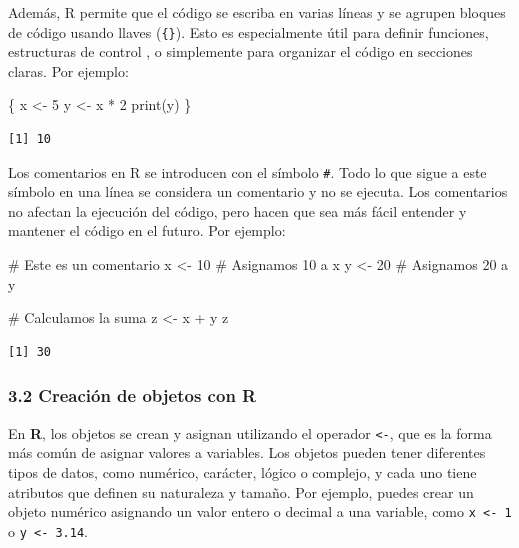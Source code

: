 \documentclass[
  letterpaper,
  DIV=11,
  numbers=noendperiod]{scrartcl}
\newenvironment{Shaded}{\begin{snugshade}}{\end{snugshade}}
\newcommand{\CommentTok}[1]{\textcolor[rgb]{0.37,0.37,0.37}{#1}}
\newcommand{\DecValTok}[1]{\textcolor[rgb]{0.68,0.00,0.00}{#1}}
\newcommand{\FunctionTok}[1]{\textcolor[rgb]{0.28,0.35,0.67}{#1}}
\newcommand{\NormalTok}[1]{\textcolor[rgb]{0.00,0.23,0.31}{#1}}
\newcommand{\OtherTok}[1]{\textcolor[rgb]{0.00,0.23,0.31}{#1}}
\newcommand{\SpecialCharTok}[1]{\textcolor[rgb]{0.37,0.37,0.37}{#1}}
\begin{document}
Además, R permite que el código se escriba en varias líneas y se agrupen
bloques de código usando llaves (\texttt{\{\}}). Esto es especialmente
útil para definir funciones, estructuras de control , o simplemente para
organizar el código en secciones claras. Por ejemplo:

\begin{Shaded}
\begin{Highlighting}[]
\NormalTok{\{}
\NormalTok{  x }\OtherTok{\textless{}{-}} \DecValTok{5}
\NormalTok{  y }\OtherTok{\textless{}{-}}\NormalTok{ x }\SpecialCharTok{*} \DecValTok{2}
  \FunctionTok{print}\NormalTok{(y)}
\NormalTok{\}}
\end{Highlighting}
\end{Shaded}

\begin{verbatim}
[1] 10
\end{verbatim}

Los comentarios en R se introducen con el símbolo \texttt{\#}. Todo lo
que sigue a este símbolo en una línea se considera un comentario y no se
ejecuta. Los comentarios no afectan la ejecución del código, pero hacen
que sea más fácil entender y mantener el código en el futuro. Por
ejemplo:

\begin{Shaded}
\begin{Highlighting}[]
\CommentTok{\# Este es un comentario}
\NormalTok{x }\OtherTok{\textless{}{-}} \DecValTok{10}  \CommentTok{\# Asignamos 10 a x}
\NormalTok{y }\OtherTok{\textless{}{-}} \DecValTok{20}  \CommentTok{\# Asignamos 20 a y}

\CommentTok{\# Calculamos la suma}
\NormalTok{z }\OtherTok{\textless{}{-}}\NormalTok{ x }\SpecialCharTok{+}\NormalTok{ y}
\NormalTok{z}
\end{Highlighting}
\end{Shaded}

\begin{verbatim}
[1] 30
\end{verbatim}

\hypertarget{creaciuxf3n-de-objetos-con-r}{%
\subsubsection{3.2 Creación de objetos con
R}\label{creaciuxf3n-de-objetos-con-r}}

En \textbf{R}, los objetos se crean y asignan utilizando el operador
\texttt{\textless{}-}, que es la forma más común de asignar valores a
variables. Los objetos pueden tener diferentes tipos de datos, como
numérico, carácter, lógico o complejo, y cada uno tiene atributos que
definen su naturaleza y tamaño. Por ejemplo, puedes crear un objeto
numérico asignando un valor entero o decimal a una variable, como
\texttt{x\ \textless{}-\ 1} o \texttt{y\ \textless{}-\ 3.14}.
\end{document}

